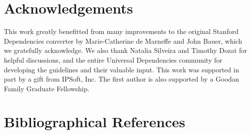 \documentclass[10pt, a4paper]{article}
\begin{document}
\section{Acknowledgements}

This work greatly benefitted from many improvements 
to the original Stanford Dependencies
converter by Marie-Catherine de Marneffe 
and John Bauer, which we gratefully acknowledge. We also
thank Natalia Silveira and Timothy Dozat for helpful discussions, and
the entire Universal Dependencies community for developing 
the guidelines and their valuable input. This work was supported in part by a gift from IPSoft, Inc. The first
author is also supported by a Goodan Family Graduate Fellowship.  



\section{Bibliographical References}
\label{main:ref}





\end{document}
